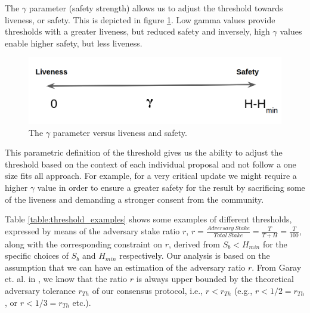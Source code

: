 The $\gamma$ parameter (safety strength) allows us to adjust the threshold 
towards liveness, or 
safety. This is depicted in figure \ref{fig:gamma_parameter}. Low gamma values 
provide thresholds with a greater liveness, but reduced safety and inversely, 
high $\gamma$ values enable higher safety, but less liveness. 

\begin{figure}[h!] %
	\centering
	\includegraphics[width=0.6\columnwidth,
	keepaspectratio]{figures/gamma.png}
	\caption{The $\gamma$ parameter versus liveness and safety.}
	\label{fig:gamma_parameter}
\end{figure}

This parametric definition of the threshold gives us the ability to adjust the 
threshold based on the context of each individual proposal and not follow a one 
size fits all approach. For example, for a very critical update we might 
require a higher $\gamma$ value in order to ensure a greater safety for the 
result by sacrificing some of the liveness and demanding a stronger consent 
from the community. 

Table \ref{table:threshold_examples} shows some examples of different 
thresholds, expressed by means of 
the adversary stake ratio $r$, $r = \frac{Adversary\ Stake}{Total\ Stake} = 
\frac{T}{T+H} = \frac{T}{100}$, along with the corresponding constraint on $r$, 
derived from $S_b < H_{min}$ for the specific choices of $S_b$ and $H_{min}$ 
respectively. Our analysis is based on the assumption 
that we can have an estimation of the adversary ratio $r$. From Garay et. al. 
in \cite{sok}, we know that the 
ratio $r$ is always upper bounded by the 
theoretical 
adversary tolerance $r_{Th}$ of our consensus protocol, i.e., $r < r_{Th}$ 
(e.g., $r < 1/2 = 
r_{Th}$, or $r < 1/3 = r_{Th}$ etc.).

